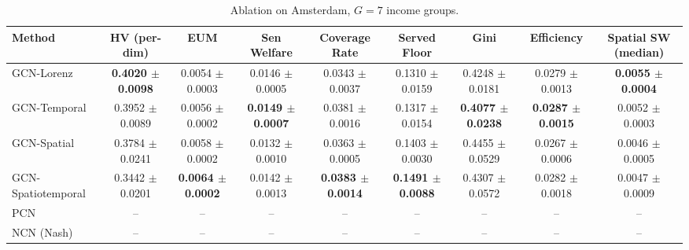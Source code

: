 \begin{table}[htbp]
\centering
\caption{Ablation on Amsterdam, $G=7$ income groups.}
\label{tab:ablation_amsterdam_g7}
\begin{tabular}{lcccccccc}
\toprule
Method & HV (per-dim) & EUM & Sen Welfare & Coverage Rate & Served Floor & Gini & Efficiency & Spatial SW (median) \\
\midrule
GCN-Lorenz & \textbf{0.4020 $\pm$ 0.0098} & 0.0054 $\pm$ 0.0003 & 0.0146 $\pm$ 0.0005 & 0.0343 $\pm$ 0.0037 & 0.1310 $\pm$ 0.0159 & 0.4248 $\pm$ 0.0181 & 0.0279 $\pm$ 0.0013 & \textbf{0.0055 $\pm$ 0.0004} \\
GCN-Temporal & 0.3952 $\pm$ 0.0089 & 0.0056 $\pm$ 0.0002 & \textbf{0.0149 $\pm$ 0.0007} & 0.0381 $\pm$ 0.0016 & 0.1317 $\pm$ 0.0154 & \textbf{0.4077 $\pm$ 0.0238} & \textbf{0.0287 $\pm$ 0.0015} & 0.0052 $\pm$ 0.0003 \\
GCN-Spatial & 0.3784 $\pm$ 0.0241 & 0.0058 $\pm$ 0.0002 & 0.0132 $\pm$ 0.0010 & 0.0363 $\pm$ 0.0005 & 0.1403 $\pm$ 0.0030 & 0.4455 $\pm$ 0.0529 & 0.0267 $\pm$ 0.0006 & 0.0046 $\pm$ 0.0005 \\
GCN-Spatiotemporal & 0.3442 $\pm$ 0.0201 & \textbf{0.0064 $\pm$ 0.0002} & 0.0142 $\pm$ 0.0013 & \textbf{0.0383 $\pm$ 0.0014} & \textbf{0.1491 $\pm$ 0.0088} & 0.4307 $\pm$ 0.0572 & 0.0282 $\pm$ 0.0018 & 0.0047 $\pm$ 0.0009 \\
PCN & -- & -- & -- & -- & -- & -- & -- & -- \\
NCN (Nash) & -- & -- & -- & -- & -- & -- & -- & -- \\
\bottomrule
\end{tabular}
\end{table}


